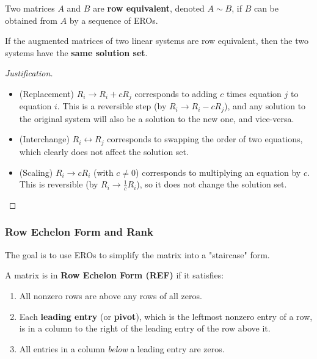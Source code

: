 \documentclass[oneside]{book}
\begin{document}
\begin{definition}
Two matrices $A$ and $B$ are \textbf{row equivalent}, denoted $A \sim B$, if $B$ can be obtained from $A$ by a sequence of EROs.
\end{definition}

\begin{theorem}
If the augmented matrices of two linear systems are row equivalent, then the two systems have the \textbf{same solution set}.
\end{theorem}
\begin{proof}[Justification]
\begin{itemize}
    \item (Replacement) $R_i \to R_i + cR_j$ corresponds to adding $c$ times equation $j$ to equation $i$. This is a reversible step (by $R_i \to R_i - cR_j$), and any solution to the original system will also be a solution to the new one, and vice-versa.
    \item (Interchange) $R_i \leftrightarrow R_j$ corresponds to swapping the order of two equations, which clearly does not affect the solution set.
    \item (Scaling) $R_i \to cR_i$ (with $c \neq 0$) corresponds to multiplying an equation by $c$. This is reversible (by $R_i \to \frac{1}{c}R_i$), so it does not change the solution set.
\end{itemize}
\end{proof}

\subsubsection{Row Echelon Form and Rank}

The goal is to use EROs to simplify the matrix into a "staircase" form.

\begin{definition}
A matrix is in \textbf{Row Echelon Form (REF)} if it satisfies:
\begin{enumerate}
    \item All nonzero rows are above any rows of all zeros.
    \item Each \textbf{leading entry} (or \textbf{pivot}), which is the leftmost nonzero entry of a row, is in a column to the right of the leading entry of the row above it.
    \item All entries in a column \emph{below} a leading entry are zeros.
\end{enumerate}
\end{definition}
\end{document}
